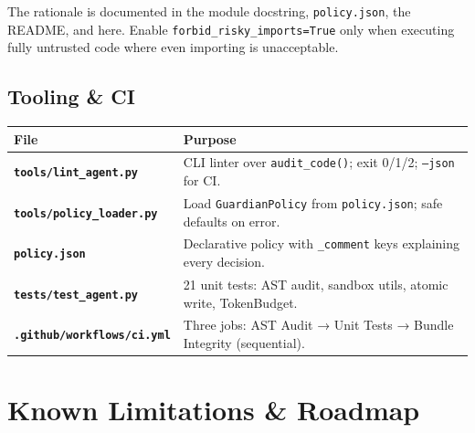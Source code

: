\documentclass[11pt, a4paper]{article}
\begin{document}
The rationale is documented in the module docstring, \texttt{policy.json},
the README, and here. Enable \texttt{forbid\_risky\_imports=True} only when
executing fully untrusted code where even importing is unacceptable.

\subsection{Tooling \& CI}


\begin{center}
\begin{tabular}{@{} >{\sffamily\bfseries}l p{9cm} @{}}
  \toprule
  File & Purpose \\
  \midrule
  \texttt{tools/lint\_agent.py}   & CLI linter over \texttt{audit\_code()};
                                    exit 0/1/2; \texttt{--json} for CI. \\
  \texttt{tools/policy\_loader.py} & Load \texttt{GuardianPolicy} from
                                    \texttt{policy.json}; safe defaults on error. \\
  \texttt{policy.json}            & Declarative policy with \texttt{\_comment}
                                    keys explaining every decision. \\
  \texttt{tests/test\_agent.py}   & 21 unit tests: AST audit, sandbox utils,
                                    atomic write, TokenBudget. \\
  \texttt{.github/workflows/ci.yml} & Three jobs: AST Audit → Unit Tests
                                    → Bundle Integrity (sequential). \\
  \bottomrule
\end{tabular}
\end{center}

\section{Known Limitations \& Roadmap}
\end{document}
